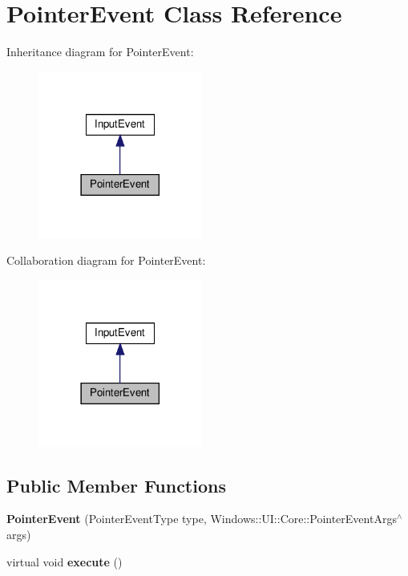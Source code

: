 \hypertarget{classPointerEvent}{}\section{Pointer\+Event Class Reference}
\label{classPointerEvent}


Inheritance diagram for Pointer\+Event\+:
\nopagebreak
\begin{figure}[H]
\begin{center}
\leavevmode
\includegraphics[width=153pt]{classPointerEvent__inherit__graph}
\end{center}
\end{figure}


Collaboration diagram for Pointer\+Event\+:
\nopagebreak
\begin{figure}[H]
\begin{center}
\leavevmode
\includegraphics[width=153pt]{classPointerEvent__coll__graph}
\end{center}
\end{figure}
\subsection*{Public Member Functions}
\begin{DoxyCompactItemize}
\item 
\mbox{\label{classPointerEvent_a470dcf2f901a89e392f3b3b160386b46}} 
{\bfseries Pointer\+Event} (Pointer\+Event\+Type type, Windows\+::\+U\+I\+::\+Core\+::\+Pointer\+Event\+Args$^\wedge$ args)
\item 
\mbox{\label{classPointerEvent_af323303257e370ef11010213a68680fc}} 
virtual void {\bfseries execute} ()
\end{DoxyCompactItemize}


